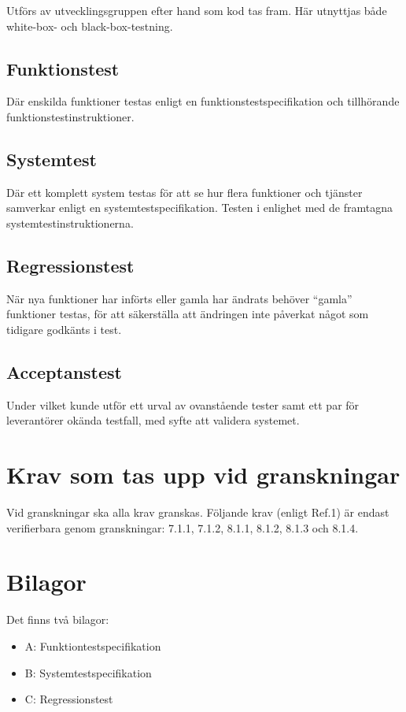 \documentclass[a4paper]{article}
\begin{document}
Utförs av utvecklingsgruppen efter hand som kod tas fram. Här utnyttjas både white-box- och black-box-testning.

\subsection{Funktionstest}

Där enskilda funktioner testas enligt en funktionstestspecifikation och tillhörande funktionstestinstruktioner. 

\subsection{Systemtest}

Där ett komplett system testas för att se hur flera funktioner och tjänster samverkar enligt en systemtestspecifikation. Testen i enlighet med de framtagna systemtestinstruktionerna. 

\subsection{Regressionstest}

När nya funktioner har införts eller gamla har ändrats behöver ``gamla'' funktioner testas, för att säkerställa att ändringen inte påverkat något som tidigare godkänts i test.

\subsection{Acceptanstest}

Under vilket kunde utför ett urval av ovanstående tester samt ett par för leverantörer okända testfall, med syfte att validera systemet.

\section{Krav som tas upp vid granskningar}

Vid granskningar ska alla krav granskas.
Följande krav (enligt Ref.1) är endast verifierbara genom granskningar: 7.1.1, 7.1.2, 8.1.1, 8.1.2, 8.1.3 och 8.1.4.

\section{Bilagor}

Det finns två bilagor:

\begin{itemize}
\item A: Funktiontestspecifikation
\item B: Systemtestspecifikation
\item C: Regressionstest

\end{itemize}
\end{document}
